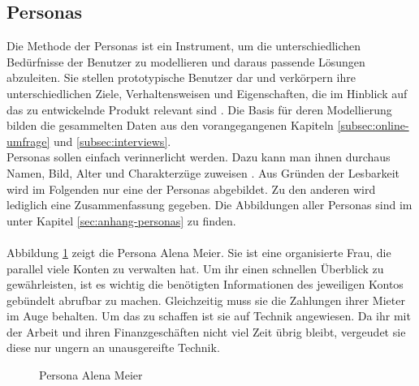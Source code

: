 \subsection{Personas}
\label{subsec:personas}
Die Methode der Personas ist ein Instrument, um die unterschiedlichen Bedürfnisse der Benutzer zu modellieren und daraus passende Lösungen abzuleiten. Sie stellen prototypische Benutzer dar und verkörpern ihre unterschiedlichen Ziele, Verhaltensweisen und Eigenschaften, die im Hinblick auf das zu entwickelnde Produkt relevant sind \cite{richter-ux-compact}. Die Basis für deren Modellierung bilden die gesammelten Daten aus den vorangegangenen Kapiteln \ref{subsec:online-umfrage} und \ref{subsec:interviews}.\\
Personas sollen einfach verinnerlicht werden. Dazu kann man ihnen durchaus Namen, Bild, Alter und Charakterzüge zuweisen \cite{richter-ux-compact}. Aus Gründen der Lesbarkeit wird im Folgenden nur eine der Personas abgebildet. Zu den anderen wird lediglich eine Zusammenfassung gegeben. Die Abbildungen aller Personas sind im  unter Kapitel \ref{sec:anhang-personas} zu finden.\\\\
Abbildung \ref{fig:alena-meier} zeigt die Persona Alena Meier. Sie ist eine organisierte Frau, die parallel viele Konten zu verwalten hat. Um ihr einen schnellen Überblick zu gewährleisten, ist es wichtig die benötigten Informationen des jeweiligen Kontos gebündelt abrufbar zu machen. Gleichzeitig muss sie die Zahlungen ihrer Mieter im Auge behalten. Um das zu schaffen ist sie auf Technik angewiesen. Da ihr mit der Arbeit und ihren Finanzgeschäften nicht viel Zeit übrig bleibt, vergeudet sie diese nur ungern an unausgereifte Technik.

\begin{figure}[!htb]
    \centering
    \caption{Persona Alena Meier}
    \label{fig:alena-meier}
\end{figure}

